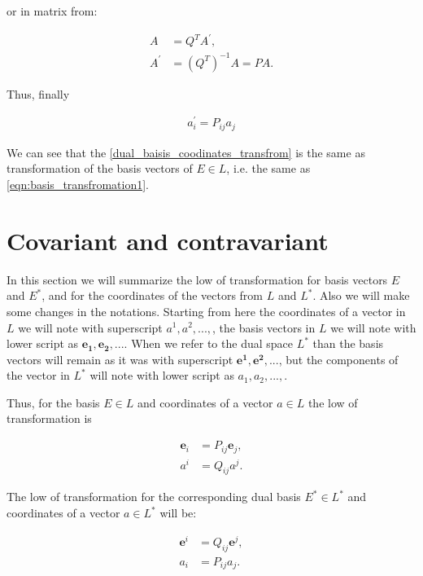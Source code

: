 \documentclass{book}
\begin{document}
or in matrix from:

\begin{align*}
A &= Q^{T}A^{'}, \\
A^{'} &= (Q^{T})^{-1}A = PA.
\end{align*}

Thus, finally

\begin{align}
a_{i}^{'} = P_{ij}a_{j} \label{dual_baisis_coodinates_transfrom}
\end{align}

We can see that the \eqref{dual_baisis_coodinates_transfrom} is the same as transformation of the basis vectors of $E \in L$, i.e. the same as \eqref{eqn:basis_transfromation1}.

\section{Covariant and contravariant}
\label{section:covariant_contravariant}

In this section we will summarize the low of transformation for basis vectors $E$ and $E^*$, and for the coordinates of the vectors from $L$ and $L^*$. Also we will make some changes in the notations.
Starting from here the coordinates of a vector in $L$ we will note with superscript $a^1, a^2,...,$, the basis vectors in $L$ we will note with lower script as $\boldsymbol{e_1}, \boldsymbol{e_2},...$.
When we refer to the dual space $L^*$ than the basis vectors will remain as it was with superscript $\boldsymbol{e^1}, \boldsymbol{e^2},...$, but the components of the vector in $L^*$ will note with lower script as $a_1, a_2,...,$. 

Thus, for the basis $E \in L$ and coordinates of a vector $a \in L$ the low of transformation is

\begin{align}
\boldsymbol{e}_{i} &= P_{ij}\boldsymbol{e}_{j}, \label{covariant_transformation_low} \\
a^{i} &= Q_{ij}a^{j}. \label{contravariant_transformation_low}
\end{align}

The low of transformation for the corresponding dual basis $E^{*} \in L^{*}$ and coordinates of a vector $a \in L^*$ will be:

\begin{align}
\boldsymbol{e}^{i} &= Q_{ij}\boldsymbol{e}^{j}, \label{dual_contravariant_transformation_low} \\
a_{i} &= P_{ij}a_{j}. \label{dual_covariant_transformation_low}
\end{align}
\end{document}
